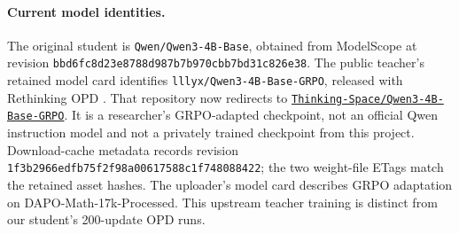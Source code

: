 \paragraph{Current model identities.}
The original student is \texttt{Qwen/Qwen3-4B-Base}, obtained from ModelScope at revision
\texttt{bbd6fc8d23e8788d987b7b970cbb7bd31c826e38}.
The public teacher's retained model card identifies \texttt{lllyx/Qwen3-4B-Base-GRPO}, released with Rethinking OPD \citep{rethinking}. That repository now redirects to \href{https://huggingface.co/Thinking-Space/Qwen3-4B-Base-GRPO}{\texttt{Thinking-Space/Qwen3-4B-Base-GRPO}}. It is a researcher's GRPO-adapted checkpoint, not an official Qwen instruction model and not a privately trained checkpoint from this project.
Download-cache metadata records revision \texttt{1f3b2966edfb75f2f98a00617588c1f748088422}; the two weight-file ETags match the retained asset hashes. The uploader's model card describes GRPO adaptation on DAPO-Math-17k-Processed. This upstream teacher training is distinct from our student's 200-update OPD runs.

